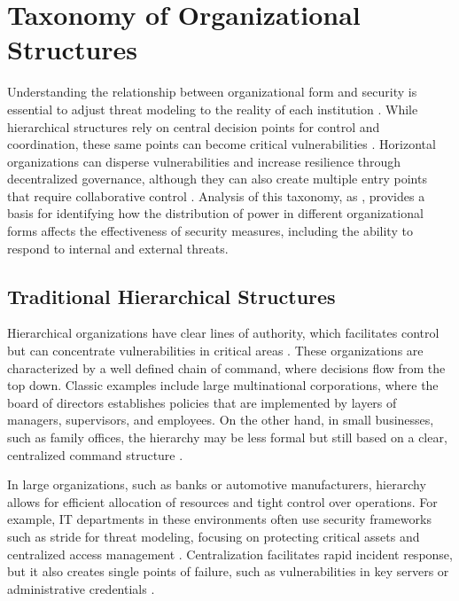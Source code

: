 \section{Taxonomy of Organizational Structures}
\label{sec:taxonomy_organizational_structures}

Understanding the relationship between organizational form and security is
essential to adjust threat modeling to the reality of each institution
\cite{Non-HierarchicalForms}. While hierarchical structures rely on central
decision points for control and coordination, these same points can become
critical vulnerabilities \cite{ThreatModelingdesigningForSecurity}. Horizontal
organizations can disperse vulnerabilities and increase resilience
through decentralized governance, although they can also create
multiple entry points that require collaborative control \cite{Colbac}. Analysis
of this taxonomy, as \cite{WorkerCooperativesinAmerica,
RealNotNominalGlobalDemocracy}, provides a basis for identifying how the
distribution of power in different organizational forms affects the
effectiveness of security measures, including the ability to respond to internal
and external threats.

\subsection{Traditional Hierarchical Structures}
\label{subsec:traditional_hierarchical_structures}

Hierarchical organizations have clear lines of authority, which facilitates
control but can concentrate vulnerabilities in critical areas
\cite{MicrosoftThreatModelingTechnique}. These organizations are characterized
by a well defined chain of command, where decisions flow from the top down.
Classic examples include large multinational corporations, where the board of
directors establishes policies that are implemented by layers of managers,
supervisors, and employees. On the other hand, in small businesses, such as
family offices, the hierarchy may be less formal but still based on a clear,
centralized command structure \cite{WorkerCooperativesinAmerica}.

In large organizations, such as banks or automotive manufacturers, hierarchy
allows for efficient allocation of resources and tight control over operations.
For example, IT departments in these environments often use security frameworks
such as \gls{stride} for threat modeling, focusing on protecting critical assets
and centralized access management \cite{MicrosoftThreatModelingTechnique,
ThreatModelingASystematicLiteratureReview}. Centralization facilitates rapid
incident response, but it also creates single points of failure, such as
vulnerabilities in key servers or administrative credentials
\cite{DoArtifactsHavePolitics, BigTech}.

